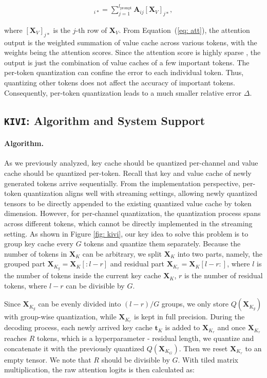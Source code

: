\begin{align}
    [{\bm{A}} {\bm{X}}_V]_{i*} = \sum_{j=1}^{l_{\text{prompt}}} {\bm{A}}_{ij} [{\bm{X}}_{V}]_{j*},
    \label{eq: att}
\end{align}

where $[{\bm{X}}_{V}]_{j*}$ is the $j$-th row of ${\bm{X}}_{V}$.
From Equation~(\ref{eq: att}), the attention output is the weighted summation of value cache across various tokens, with the weights being the attention scores. Since the attention score is highly sparse \citep{tian2023scan}, the output is just the combination of value caches of a few important tokens. The per-token quantization can confine the error to each individual token. Thus, quantizing other tokens does not affect the accuracy of important tokens. Consequently, per-token quantization leads to a much smaller relative error $\Delta$. 

\subsection{\texttt{KIVI}: Algorithm and System Support}
\label{sec: algo}

\paragraph{Algorithm.}
As we previously analyzed, key cache should be quantized per-channel and value cache should be quantized per-token. Recall that key and value cache of newly generated tokens arrive sequentially. From the implementation perspective, per-token quantization aligns well with streaming settings, allowing newly quantized tensors to be directly appended to the existing quantized value cache by token dimension. However, for per-channel quantization, the quantization process spans across different tokens, which cannot be directly implemented in the streaming setting. As shown in Figure \ref{fig: kivi}, our key idea to solve this problem is to group key cache every $G$ tokens and quantize them separately. Because the number of tokens in ${\bm{X}}_K$ can be arbitrary, we split ${\bm{X}}_K$ into two parts, namely, the grouped part ${\bm{X}}_{K_g}={\bm{X}}_{K}[:l-r]$ and residual part ${\bm{X}}_{K_r}={\bm{X}}_{K}[l-r:]$, where $l$ is the number of tokens inside the current key cache ${\bm{X}}_K$, $r$ is the number of residual tokens, where $l-r$ can be divisible by $G$.

Since ${\bm{X}}_{K_g}$ can be evenly divided into $(l-r)/G$ groups, we only store $Q({\bm{X}}_{K_g})$ with group-wise quantization, while ${\bm{X}}_{K_r}$ is kept in full precision. During the decoding process, each newly arrived key cache ${\bm{t}}_K$ is added to ${\bm{X}}_{K_r}$ and once ${\bm{X}}_{K_r}$ reaches $R$ tokens, which is a hyperparameter - residual length, we quantize and concatenate it with the previously quantized $Q({\bm{X}}_{K_G})$. 
Then we reset ${\bm{X}}_{K_r}$ to an empty tensor. We note that $R$ should be divisible by $G$. With tiled matrix multiplication, the raw attention logits is then calculated as:

